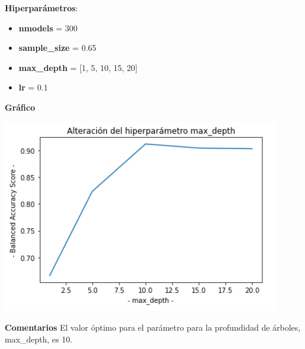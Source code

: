 \documentclass[conference,a4paper]{IEEEtran}
\begin{document}
\begin{textb}
    \textbf{Hiperparámetros}:
  \begin{itemize}
      \item \textbf{nmodels} = 300
      \item \textbf{sample\_size} = 0.65
      \item \textbf{max\_depth} = [1, 5, 10, 15, 20]
      \item \textbf{lr} = 0.1
  \end{itemize}
  \textbf{Gráfico}
  
  \begin{center}
    \includegraphics[scale=0.80]{figures/maxdepth_adultDataset_trees.png}
    \label{fig:funcion_clasificacion}
  \end{center}
  
  \textbf{Comentarios} El valor óptimo para el parámetro para la profundidad de árboles, max\_depth, es 10.
\end{textb}
\end{document}
